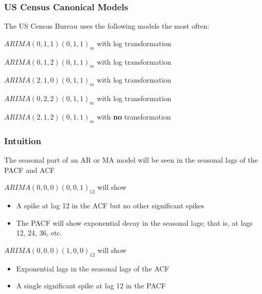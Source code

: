 \documentclass{beamer}
\newenvironment{wideitemize}{\itemize\addtolength{\itemsep}{10pt}}{\enditemize}
\begin{document}
\begin{frame}
  \frametitle{US Census Canonical Models}

  The US Census Bureau uses the following models the most often:

  \begin{wideitemize}
  \item $ARIMA(0,1,1)(0,1,1)_m$ with log transformation
  \item $ARIMA(0,1,2)(0,1,1)_m$ with log transformation
  \item $ARIMA(2,1,0)(0,1,1)_m$ with log transformation
  \item $ARIMA(0,2,2)(0,1,1)_m$ with log transformation
  \item $ARIMA(2,1,2)(0,1,1)_m$ with \textbf{no} transformation    
  \end{wideitemize}  
\end{frame}


\begin{frame}
  \frametitle{Intuition}

  The seasonal part of an AR or MA model will be seen in the seasonal lags of the PACF and ACF


  \begin{exampleblock}{$ARIMA(0,0,0)(0,0,1)_{12}$  will show}

    \begin{itemize}
    \item A spike at lag 12 in the ACF but no other significant spikes
    \item The PACF will show exponential decay in the seasonal lags; that is, at lags 12, 24, 36, etc.
    \end{itemize}
    
  \end{exampleblock}
  
\medskip

  \begin{exampleblock}{$ARIMA(0,0,0)(1,0,0)_{12}$  will show}

    \begin{itemize}
    \item Exponential lags in the seasonal lags of the ACF
    \item A single significant spike at lag 12 in the PACF
    \end{itemize}
    
  \end{exampleblock}

\end{frame}
\end{document}
